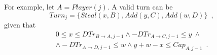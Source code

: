 For example, let $A = Player(j)$. A valid turn can be
\begin{equation*}
  Turn_j = \{Steal\left(x, B\right), Add\left(y, C\right), Add\left(w, D\right)\} \enspace,
\end{equation*}
given that
\begin{equation*}
\begin{gathered}
  0 \leq x \leq DTr_{B \rightarrow A, j-1} \wedge -DTr_{A \rightarrow C, j-1} \leq y \: \wedge \\
  \wedge -DTr_{A \rightarrow D, j-1} \leq w \wedge y + w - x \leq Cap_{A, j-1} \enspace.
\end{gathered}
\end{equation*}
